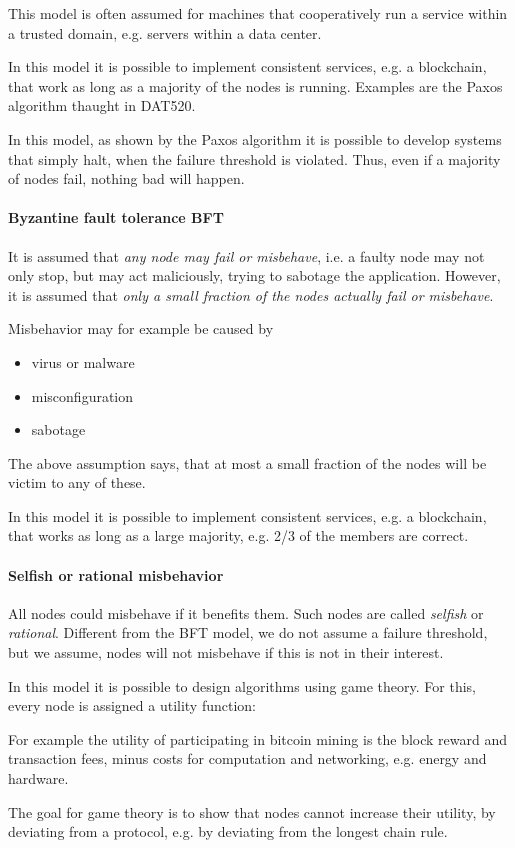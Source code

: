 This model is often assumed for machines that cooperatively run a service within a trusted domain, e.g. servers within a data center. 

In this model it is possible to implement consistent services, e.g. a blockchain, that work as long as a majority of the nodes is running. Examples are the Paxos algorithm thaught in DAT520.

In this model, as shown by the Paxos algorithm it is possible to develop systems that simply halt, when the failure threshold is violated.
Thus, even if a majority of nodes fail, nothing bad will happen.

\paragraph{Byzantine fault tolerance BFT}
It is assumed that \emph{any node may fail or misbehave}, i.e. a faulty node may not only stop, but may act maliciously, trying to sabotage the application. However, it is assumed that \emph{only a small fraction of the nodes actually fail or misbehave}.

Misbehavior may for example be caused by 
\begin{itemize}
	\item virus or malware
	\item misconfiguration
	\item sabotage
\end{itemize}
The above assumption says, that at most a small fraction of the nodes will be victim to any of these.

In this model it is possible to implement consistent services, e.g. a blockchain, that works as long as a large majority, e.g. 2/3 of the members are correct.

\paragraph{Selfish or rational misbehavior}
All nodes could misbehave if it benefits them. Such nodes are called \emph{selfish} or \emph{rational}.
Different from the BFT model, we do not assume a failure threshold, but we assume, nodes will not misbehave if this is not in their interest.

In this model it is possible to design algorithms using game theory. 
For this, every node is assigned a utility function:

For example the utility of participating in bitcoin mining is the block reward and transaction fees, minus costs for computation and networking, e.g. energy and hardware.

The goal for game theory is to show that nodes cannot increase their utility, by deviating from a protocol, e.g. by deviating from the longest chain rule.